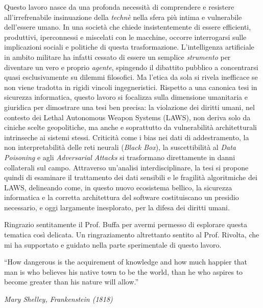 \documentclass[a4paper,12pt]{report}
\begin{document}
Questo lavoro nasce da una profonda necessità di comprendere e resistere all'irrefrenabile insinuazione della \textit{technè} nella sfera più intima e vulnerabile dell'essere umano. In una società che chiede insistentemente di essere efficienti, produttivi, iperconnessi e miscelati con le macchine, occorre interrogarsi sulle implicazioni sociali e politiche di questa trasformazione.
L'intelligenza artificiale in ambito militare ha infatti cessato di essere un semplice \textit{strumento} per diventare un vero e proprio \textit{agente}, spingendo il dibattito pubblico a concentrarsi quasi esclusivamente su dilemmi filosofici. Ma l'etica da sola si rivela inefficace se non viene tradotta in rigidi vincoli ingegneristici.
Rispetto a una canonica tesi in sicurezza informatica, questo lavoro si focalizza sulla dimensione umanitaria e giuridica per dimostrare una tesi ben precisa: la violazione dei diritti umani, nel contesto dei Lethal Autonomous Weapon Systems (LAWS), non deriva solo da ciniche scelte geopolitiche, ma anche e soprattutto da vulnerabilità architetturali intrinseche ai sistemi stessi. Criticità come i bias nei dati di addestramento, la non interpretabilità delle reti neurali (\textit{Black Box}), la suscettibilità al \textit{Data Poisoning} e agli \textit{Adversarial Attacks} si trasformano direttamente in danni collaterali sul campo.
Attraverso un'analisi interdisciplinare, la tesi si propone quindi di esaminare il trattamento dei dati sensibili e le fragilità algoritmiche dei LAWS, delineando come, in questo nuovo ecosistema bellico, la sicurezza informatica e la corretta architettura del software costituiscano un presidio necessario, e oggi largamente inesplorato, per la difesa dei diritti umani.

Ringrazio sentitamente il Prof. Buffa per avermi permesso di esplorare questa tematica così delicata.
Un ringraziamento altrettanto sentito al Prof. Rivolta, che mi ha supportato e guidato nella parte sperimentale di questo lavoro.


\afterpreface


\begin{flushright}
\begin{minipage}{0.6\textwidth}
\epigraph{
    ``How dangerous is the acquirement of knowledge and how much happier that man is who believes his native town to be the world, than he who aspires to become greater than his nature will allow.''
}{\textit{Mary Shelley, Frankenstein (1818)}}
\end{minipage}
\end{flushright}
 
\end{document}
